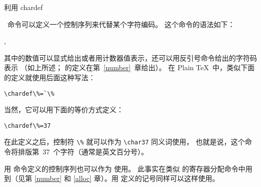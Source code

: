 \documentclass{book}
\begin{document}
利用 \csterm chardef\par\ 命令可以定义一个控制序列来代替某个字符编码。
这个命令的语法如下：\label{chardef}
\begin{disp}
,
\end{disp}
其中的数值可以显式给出或者用计数器值表示，还可以用反引号命令给出的字符码表示%
（如上所述； 的定义在第~\ref{number}~章给出）。
在 Plain \TeX\ 中，类似下面的定义就使用后面这种写法：
\begin{verbatim}
\chardef\%=`\%
\end{verbatim}
当然，它可以用下面的等价方式定义：
\begin{verbatim}
\chardef\%=37
\end{verbatim}
在此定义之后，控制符 \verb>\%> 就可以作为 \verb>\char37> 同义词使用，
也就是说，这个命令将排版第~37~个字符（通常是英文百分号）。


用  命令定义的控制序列也可以作为  使用。
此事实在类似  的寄存器分配命令中用到（见第 \ref{number} 和
\ref{alloc} 章）。用  定义的记号同样可以这样使用。
\end{document}

